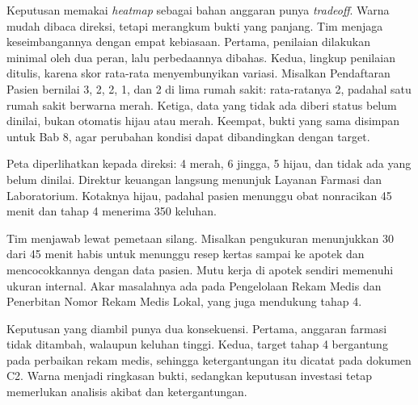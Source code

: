 Keputusan memakai \textit{heatmap} sebagai bahan anggaran punya \textit{tradeoff}. Warna mudah dibaca direksi,
tetapi merangkum bukti yang panjang. Tim menjaga keseimbangannya dengan empat kebiasaan. Pertama, penilaian
dilakukan minimal oleh dua peran, lalu perbedaannya dibahas. Kedua, lingkup penilaian ditulis, karena skor
rata-rata menyembunyikan variasi. Misalkan Pendaftaran Pasien bernilai 3, 2, 2, 1, dan 2 di lima rumah sakit:
rata-ratanya 2, padahal satu rumah sakit berwarna merah. Ketiga, data yang tidak ada diberi status belum dinilai,
bukan otomatis hijau atau merah. Keempat, bukti yang sama disimpan untuk Bab 8, agar perubahan kondisi dapat
dibandingkan dengan target.

\begin{kasus}[title={Kasus Medikara Health: Mengapa Farmasi Hijau, padahal Pasien Menunggu 45 Menit?}]
  Peta diperlihatkan kepada direksi: 4 merah, 6 jingga, 5 hijau, dan tidak ada yang belum dinilai. Direktur
  keuangan langsung menunjuk Layanan Farmasi dan Laboratorium. Kotaknya hijau, padahal pasien menunggu obat
  nonracikan 45 menit dan tahap 4 menerima 350 keluhan.

  Tim menjawab lewat pemetaan silang. Misalkan pengukuran menunjukkan 30 dari 45 menit habis untuk menunggu resep
  kertas sampai ke apotek dan mencocokkannya dengan data pasien. Mutu kerja di apotek sendiri memenuhi ukuran
  internal. Akar masalahnya ada pada Pengelolaan Rekam Medis dan Penerbitan Nomor Rekam Medis Lokal, yang juga
  mendukung tahap 4.

  Keputusan yang diambil punya dua konsekuensi. Pertama, anggaran farmasi tidak ditambah, walaupun keluhan tinggi.
  Kedua, target tahap 4 bergantung pada perbaikan rekam medis, sehingga ketergantungan itu dicatat pada dokumen C2.
  Warna menjadi ringkasan bukti, sedangkan keputusan investasi tetap memerlukan analisis akibat dan ketergantungan.
\end{kasus}


